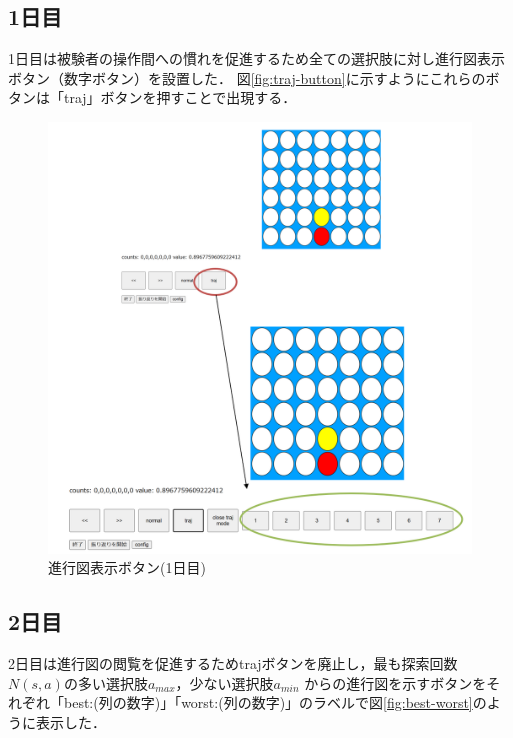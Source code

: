 \subsection{1日目}
1日目は被験者の操作間への慣れを促進するため全ての選択肢に対し進行図表示ボタン（数字ボタン）を設置した．
図\ref{fig:traj-button}に示すようにこれらのボタンは「traj」ボタンを押すことで出現する．

\begin{figure}[htbp]
	\centering
	\includegraphics[width=\linewidth]{./figure/traj-button.png}
	\caption{進行図表示ボタン(1日目)}
	\label{fig:multi}
\end{figure}

\subsection{2日目}
2日目は進行図の閲覧を促進するためtrajボタンを廃止し，最も探索回数$N(s,a)$の多い選択肢$a_{max}$，少ない選択肢$a_{min}$
からの進行図を示すボタンをそれぞれ「best:(列の数字)」「worst:(列の数字)」のラベルで図\ref{fig:best-worst}のように表示した．

